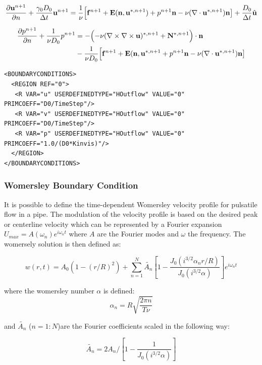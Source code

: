 \begin{equation}
  \frac{\partial \mathbf{u}^{n+1}}{\partial n} + \frac{\gamma_0 D_0}{\Delta t} \mathbf{u}^{n+1} = \frac{1}{\nu}\Bigl[\mathbf{f}^{n+1} + \mathbf{E}(\mathbf{n},\mathbf{u}^{*,n+1}) + p^{n+1}\mathbf{n} -\nu(\nabla\cdot \mathbf{u}^{*,n+1}) \mathbf{n}
    \bigr] + \frac{D_0}{\Delta t}\hat{\mathbf{u}}
 \end{equation}

\begin{align}
  \frac{\partial p^{n+1}}{\partial n} + \frac{1}{\nu D_0} p^{n+1} &=
   - \Bigl( -\nu (\nabla \times \nabla \times   \mathbf{u})^{*,n+1} + \mathbf{N}^{*,n+1}\Bigr)\cdot \mathbf{n} \nonumber \\
 & - \frac{1}{\nu D_0}\Bigl[\mathbf{f}^{n+1} + \mathbf{E}(\mathbf{n},\mathbf{u}^{*,n+1} + p^{n+1}\mathbf{n} -\nu(\nabla\cdot \mathbf{u}^{*,n+1}) \mathbf{n}
   \bigr] 
 \end{align}


\begin{lstlisting}[style=XMLStyle]
<BOUNDARYCONDITIONS>
  <REGION REF="0">
   <R VAR="u" USERDEFINEDTYPE="HOutflow" VALUE="0" PRIMCOEFF="D0/TimeStep"/>
   <R VAR="v" USERDEFINEDTYPE="HOutflow" VALUE="0" PRIMCOEFF="D0/TimeStep"/>
   <R VAR="p" USERDEFINEDTYPE="HOutflow" VALUE="0" PRIMCOEFF="1.0/(D0*Kinvis)"/>
  </REGION>
</BOUNDARYCONDITIONS>
\end{lstlisting}

\subsubsection{Womersley Boundary Condition}

It is possible to define the time-dependent Womersley velocity profile
for pulsatile flow in a pipe. The modulation of the velocity profile
is based on the desired peak or centerline velocity which can be
represented by a Fourier expansion $U_{max}=A(\omega_n)e^{i\omega_n
  t}$ where $A$ are the Fourier modes and $\omega $ the frequency. The
womersely solution is then defined as:

$$ w(r,t) = A_0(1-(r/R)^2) + \sum_{n=1}^N
\tilde{A_n}[1-\frac{J_0(i^{3/2}\alpha_n r/R)}{J_0(i^{3/2}
    \alpha)}]e^{i\omega_n t} $$

where the womersley number $\alpha$ is defined:
$$ \alpha_n = R\sqrt{\frac{2\pi n}{T\nu}}$$

and $\tilde{A_n}$ ($n=1:N$)are the Fourier coefficients scaled in the
following way:

$$ \tilde{A_n} = 2A_n/[1 - \frac{1}{J_0(i^{3/2}\alpha)}] $$

